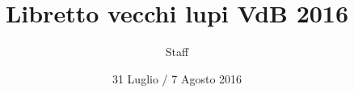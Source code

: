 \documentclass[a4paper]{article}
\title{Libretto vecchi lupi VdB 2016}
\author{Staff}
\date{31 Luglio / 7 Agosto 2016}
\begin{document}
\begin{titlepage}
\begin{figure}[p]
    \vspace*{-2cm}
    \end{figure}
\end{titlepage}
\end{document}
